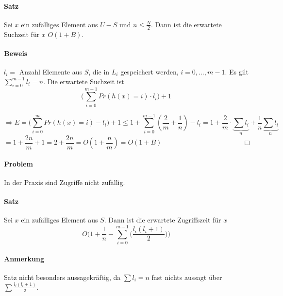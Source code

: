 \paragraph*{Satz} Sei $x$ ein zufälliges Element aus $U-S$ und $n \leq \frac{N}{2}$. Dann ist die erwartete Suchzeit für $x$ $O(1+B)$.

\paragraph*{Beweis} $l_i =$ Anzahl Elemente aus $S$, die in $L_i$ gespeichert werden, $i=0,\dots,m-1$. Es gilt $\sum\limits_{i=0}^{m-1} l_i = n$. Die erwartete Suchzeit ist $$\bigg(\sum\limits_{i=0}^{m-1} Pr(h(x)=i) \cdot l_i\bigg)+1$$


$$\Rightarrow E = \big( \sum\limits_{i=0}^m Pr(h(x)=i) - l_i \big) + 1 \leq 1+ \sum\limits_{i=0}^{m-1}(\frac{2}{m}+\frac{1}{n}) - l_i = 1+\frac{2}{m} \cdot \underbrace{\sum l_i}_{n} + \frac{1}{n} \underbrace{\sum l_i}_{n}$$ %
$$= 1+\frac{2n}{m}+1 = 2+\frac{2n}{m} = O(1+\frac{n}{m}) = O(1+B) \hspace{5cm} \Box$$


\paragraph*{Problem} In der Praxis sind Zugriffe nicht zufällig.

\paragraph*{Satz} Sei $x$ ein zufälliges Element aus $S$. Dann ist die erwartete Zugriffszeit für $x$ $$ O\Bigg(1+\frac{1}{n} - \sum\limits_{i=0}^{m-1}\Big( \frac{l_i(l_i+1)}{2} \Big)\Bigg) $$

\paragraph*{Anmerkung} Satz nicht besonders aussagekräftig, da $\sum l_i = n$ fast nichts aussagt über $\sum \frac{l_i(l_i+1)}{2}$.

